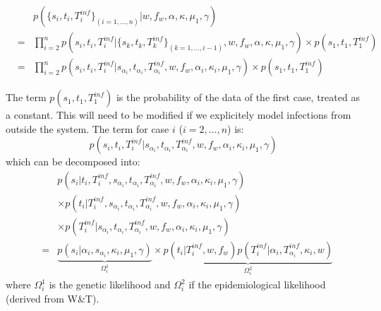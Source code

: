 \documentclass[10pt]{article}
\begin{document}
\begin{eqnarray}
& & p(\{s_i, t_i, T_i^{inf}\}_{(i=1,\ldots,n)}|  w, f_w, \alpha, \kappa, \mu_1, \gamma) \\
& = & \prod_{i=2}^n p(s_i, t_i, T_i^{inf} | \{s_k, t_k, T_k^{inf} \}_{(k=1,\ldots,i-1)}, w, f_w, \alpha, \kappa, \mu_1, \gamma) 
  \times p(s_1, t_1, T_1^{inf})\\
& = & \prod_{i=2}^n p(s_i, t_i, T_i^{inf}| s_{\alpha_i}, t_{\alpha_i}, T_{\alpha_i}^{inf},  w, f_w, \alpha_i, \kappa_i, \mu_1, \gamma) 
  \times p(s_1, t_1, T_1^{inf})
\end{eqnarray}


The term $p(s_1, t_1, T_1^{inf})$ is the probability of the data of the first case, treated as a constant.
This will need to be modified if we explicitely model infections from outside the system.
The term for case $i$ ($i=2,\ldots,n$) is:
\begin{equation}
 p(s_i, t_i, T_i^{inf}| s_{\alpha_i}, t_{\alpha_i}, T_{\alpha_i}^{inf},  w, f_w, \alpha_i, \kappa_i, \mu_1, \gamma )
\end{equation}
which can be decomposed into:
\begin{eqnarray}
& & p(s_i | t_i, T_i^{inf}, s_{\alpha_i}, t_{\alpha_i}, T_{\alpha_i}^{inf},  w, f_w, \alpha_i, \kappa_i, \mu_1, \gamma) \nonumber \\
& &  \times  p(t_i | T_i^{inf}, s_{\alpha_i}, t_{\alpha_i}, T_{\alpha_i}^{inf},  w, f_w, \alpha_i, \kappa_i, \mu_1, \gamma) \nonumber \\
& & \times  p(T_i^{inf}| s_{\alpha_i}, t_{\alpha_i}, T_{\alpha_i}^{inf},  w, f_w, \alpha_i, \kappa_i, \mu_1, \gamma) \nonumber \\
& = & 
\underbrace{p(s_i | \alpha_i, s_{\alpha_i}, \kappa_i, \mu_1, \gamma)}_{\Omega_i^1} 
  \times  \underbrace{p(t_i | T_i^{inf}, w, f_w) 
  p(T_i^{inf}| \alpha_i, T_{\alpha_i}^{inf}, \kappa_i, w)}_{\Omega_i^2}
\end{eqnarray}
\noindent where $\Omega_i^1$ is the genetic likelihood and $\Omega_i^2$ if the epidemiological likelihood (derived from W\&T).
\\
\end{document}
